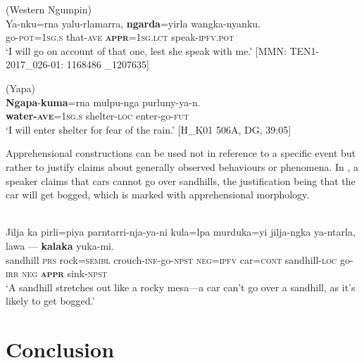 \documentclass[output=paper,colorlinks,citecolor=brown]{langscibook}
\begin{document}
\ea 
\textnormal{ (Western Ngumpin)} \\
\gll Ya-nku=rna yalu-rlamarra, \textbf{ngarda}=yirla wangka-nyanku. \\
go-\textsc{pot=1sg.s} that-\textsc{ave} \textsc{\textbf{appr}=1sg.lct} speak-\textsc{ipfv.pot} \\
\glt `I will go on account of that one, lest she speak with me.' [MMN: TEN1-2017\_026-01: 1168486 \_1207635]
\label{ex:bro84}
\z

\ea 
\textnormal{ (Yapa)} \\
\gll \textbf{Ngapa}-\textbf{kuma}=rna mulpu-nga purluny-ya-n. \\
\textbf{water-\textsc{ave}}=\textsc{1sg.s} shelter-\textsc{loc} enter-go-\textsc{fut}  \\
\glt `I will enter shelter for fear of the rain.' [H\_K01 506A, DG, 39:05]
\label{ex:bro85}
\z

\largerpage
 Apprehensional constructions can be used not in reference to a specific event but rather to justify claims about generally observed behaviours or phenomena. In , a speaker claims that cars cannot go over sandhills, the justification being that the car will get bogged, which is marked with apprehensional morphology.

\ea
{} \\
\gll Jilja ka pirli=piya parntarri-nja-ya-ni kula=lpa  murduka=yi jilja-ngka ya-ntarla, lawa --- \textbf{kalaka} yuka-mi. \\
sandhill \textsc{prs} rock=\textsc{sembl} crouch-\textsc{inf}-go-\textsc{npst} \textsc{neg=ipfv} car=\textsc{cont} sandhill-\textsc{loc} go-\textsc{irr} \textsc{neg} \phantom{---} \textsc{\textbf{appr}} sink-\textsc{npst} \\
\glt `A sandhill stretches out like a rocky mesa---a car can't go over a sandhill, as it's likely to get bogged.'
\label{ex:bro86}
\z

\section{Conclusion}
\end{document}
